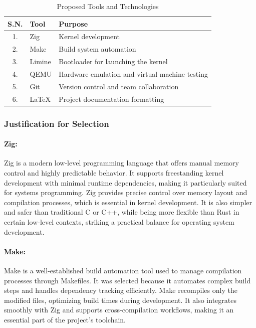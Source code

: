 \documentclass[12pt]{extarticle}
\begin{document}
\renewcommand{\arraystretch}{1.5} %
\begin{table}[H]
    \centering
    \begin{tabular}{|c|p{4cm}|p{9cm}|}
        \hline
        \textbf{S.N.} & \textbf{Tool} & \textbf{Purpose} \\
        \hline
        1. & Zig & Kernel development \\
        \hline
        2. & Make & Build system automation \\
        \hline
        3. & Limine & Bootloader for launching the kernel \\
        \hline
        4. & QEMU & Hardware emulation and virtual machine testing \\
        \hline
        5. & Git & Version control and team collaboration \\
        \hline
        6. & \LaTeX{} & Project documentation formatting \\
        \hline
    \end{tabular}
    \caption{Proposed Tools and Technologies}
    \label{tab:techs}
\end{table}

\subsubsection*{Justification for Selection}

\paragraph{Zig:}
Zig is a modern low-level programming language that offers manual memory control
and highly predictable behavior. It supports freestanding kernel development
with minimal runtime dependencies, making it particularly suited for systems
programming. Zig provides precise control over memory layout and compilation
processes, which is essential in kernel development. It is also simpler and
safer than traditional C or C++, while being more flexible than Rust in certain
low-level contexts, striking a practical balance for operating system
development.

\paragraph{Make:}
Make is a well-established build automation tool used to manage compilation
processes through Makefiles. It was selected because it automates complex build
steps and handles dependency tracking efficiently. Make recompiles only the
modified files, optimizing build times during development. It also integrates
smoothly with Zig and supports cross-compilation workflows, making it an
essential part of the project's toolchain.
\end{document}
